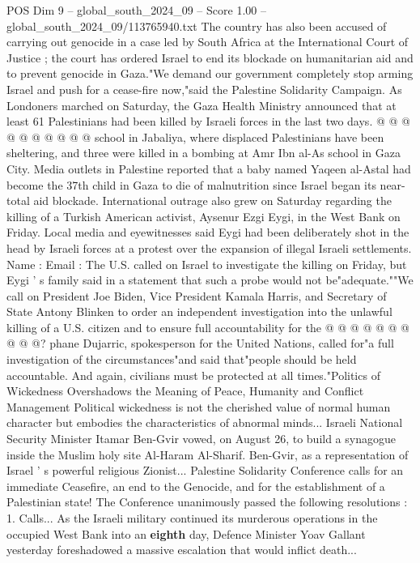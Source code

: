 \begin{textsample}{POS Dim 9 – global\_south\_2024\_09 – Score 1.00 – global\_south\_2024\_09/113765940.txt}
The country has also been accused of carrying out genocide in a case led by South Africa at the International Court of Justice ; the court has ordered Israel to end its blockade on humanitarian aid and to prevent genocide in Gaza."We demand our government completely stop arming Israel and push for a cease-fire now,"said the Palestine Solidarity Campaign.
As Londoners marched on Saturday, the Gaza Health Ministry announced that at least 61 Palestinians had been killed by Israeli forces in the last two days. @ @ @ @ @ @ @ @ @ @ school in Jabaliya, where displaced Palestinians have been sheltering, and three were killed in a bombing at Amr Ibn al-As school in Gaza City.
Media outlets in Palestine reported that a baby named Yaqeen al-Astal had become the 37th child in Gaza to die of malnutrition since Israel began its near-total aid blockade.
International outrage also grew on Saturday regarding the killing of a Turkish American activist, Aysenur Ezgi Eygi, in the West Bank on Friday.
Local media and eyewitnesses said Eygi had been deliberately shot in the head by Israeli forces at a protest over the expansion of illegal Israeli settlements.
Name : Email : The U.S. called on Israel to investigate the killing on Friday, but Eygi ' s family said in a statement that such a probe would not be"adequate.""We call on President Joe Biden, Vice President Kamala Harris, and Secretary of State Antony Blinken to order an independent investigation into the unlawful killing of a U.S. citizen and to ensure full accountability for the @ @ @ @ @ @ @ @ @ @? phane Dujarric, spokesperson for the United Nations, called for"a full investigation of the circumstances"and said that"people should be held accountable.
And again, civilians must be protected at all times."Politics of Wickedness Overshadows the Meaning of Peace, Humanity and Conflict Management Political wickedness is not the cherished value of normal human character but embodies the characteristics of abnormal minds...
Israeli National Security Minister Itamar Ben-Gvir vowed, on August 26, to build a synagogue inside the Muslim holy site Al-Haram Al-Sharif.
Ben-Gvir, as a representation of Israel ' s powerful religious Zionist...
Palestine Solidarity Conference calls for an immediate Ceasefire, an end to the Genocide, and for the establishment of a Palestinian state!
The Conference unanimously passed the following resolutions : 1.
Calls...
As the Israeli military continued its murderous operations in the occupied West Bank into an \textbf{eighth} day, Defence Minister Yoav Gallant yesterday foreshadowed a massive escalation that would inflict death...

\end{textsample}
